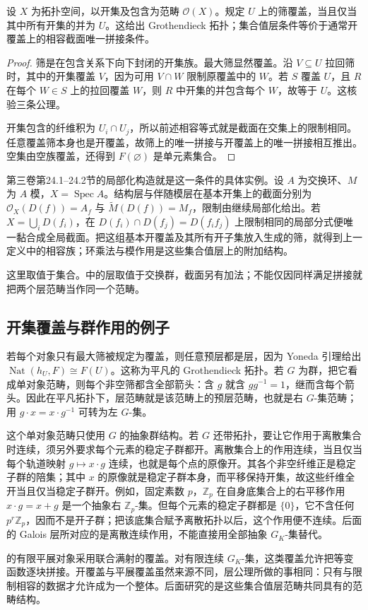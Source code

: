 \begin{proposition}\label{b4:prop:open-site-sheaves}
	设 \(X\) 为拓扑空间，以开集及包含为范畴 \(\mathcal O(X)\)。规定 \(U\) 上的筛覆盖，当且仅当其中所有开集的并为 \(U\)。这给出 Grothendieck 拓扑；集合值层条件等价于通常开覆盖上的相容截面唯一拼接条件。
\end{proposition}
\begin{proof}
	筛是在包含关系下向下封闭的开集族。最大筛显然覆盖。沿 \(V\subseteq U\) 拉回筛时，其中的开集覆盖 \(V\)，因为可用 \(V\cap W\) 限制原覆盖中的 \(W\)。若 \(S\) 覆盖 \(U\)，且 \(R\) 在每个 \(W\in S\) 上的拉回覆盖 \(W\)，则 \(R\) 中开集的并包含每个 \(W\)，故等于 \(U\)。这核验三条公理。

	开集包含的纤维积为 \(U_i\cap U_j\)，所以前述相容等式就是截面在交集上的限制相同。任意覆盖筛本身也是开覆盖，故筛上的唯一拼接与开覆盖上的唯一拼接相互推出。空集由空族覆盖，还得到 \(F(\varnothing)\) 是单元素集合。
\end{proof}

第三卷第24.1--24.2节的局部化构造就是这一条件的具体实例。设 \(A\) 为交换环、\(M\) 为 \(A\) 模，\(X=\operatorname{Spec}A\)。结构层与伴随模层在基本开集上的截面分别为 \(\mathcal O_X(D(f))=A_f\) 与 \(\widetilde M(D(f))=M_f\)，限制由继续局部化给出。若 \(X=\bigcup_iD(f_i)\)，在 \(D(f_i)\cap D(f_j)=D(f_if_j)\) 上限制相同的局部分式便唯一黏合成全局截面。把这组基本开覆盖及其所有开子集放入生成的筛，就得到上一定义中的相容族；环乘法与模作用是这些集合值层上的附加结构。

\ProseParagraphBreak
这里取值于集合。中的层取值于交换群，截面另有加法；不能仅因同样满足拼接就把两个层范畴当作同一个范畴。

\subsection{开集覆盖与群作用的例子}
\label{b4:subsec:E01:03}

若每个对象只有最大筛被规定为覆盖，则任意预层都是层，因为 Yoneda 引理给出 \(\operatorname{Nat}(h_U,F)\cong F(U)\)。这称为平凡的 Grothendieck 拓扑。若 \(G\) 为群，把它看成单对象范畴，则每个非空筛都含全部箭头：含 \(g\) 就含 \(gg^{-1}=1\)，继而含每个箭头。因此在平凡拓扑下，层范畴就是该范畴上的预层范畴，也就是右 \(G\)-集范畴；用 \(g\cdot x=x\cdot g^{-1}\) 可转为左 \(G\)-集。

\ProseParagraphBreak
这个单对象范畴只使用 \(G\) 的抽象群结构。若 \(G\) 还带拓扑，要让它作用于离散集合时连续，须另外要求每个元素的稳定子群都开。离散集合上的作用连续，当且仅当每个轨道映射 \(g\mapsto x\cdot g\) 连续，也就是每个点的原像开。其各个非空纤维正是稳定子群的陪集；其中 \(x\) 的原像就是稳定子群本身，而平移保持开集，故这些纤维全开当且仅当稳定子群开。例如，固定素数 \(p\)，\(\mathbb Z_p\) 在自身底集合上的右平移作用 \(x\cdot g=x+g\) 是一个抽象右 \(\mathbb Z_p\)-集。但每个元素的稳定子群都是 \(\{0\}\)，它不含任何 \(p^r\mathbb Z_p\)，因而不是开子群；把该底集合赋予离散拓扑以后，这个作用便不连续。后面的 Galois 层所对应的是离散连续作用，不能直接用全部抽象 \(G_K\)-集替代。

\ProseParagraphBreak
{}的有限平展对象采用联合满射的覆盖。对有限连续 \(G_K\)-集，这类覆盖允许把等变函数逐块拼接。开覆盖与平展覆盖虽然来源不同，层公理所做的事相同：只有与限制相容的数据才允许成为一个整体。后面研究的是这些集合值层范畴共同具有的范畴结构。

